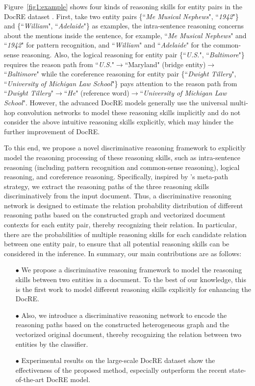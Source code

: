 \documentclass[11pt,a4paper]{article}
\begin{document}
Figure~\ref{fig1:example} shows four kinds of reasoning skills for entity pairs in the DocRE dataset \cite{yao-etal-2019-docred}.
First, take two entity pairs \{``\textit{Me Musical Nephews}", ``\textit{1942}"\} and \{``\textit{William}", ``\textit{Adelaide}"\} as examples, the intra-sentence reasoning concerns about the mentions inside the sentence, for example, ``\textit{Me Musical Nephews}" and ``\textit{1942}" for pattern recognition, and ``\textit{William}" and ``\textit{Adelaide}" for the common-sense reasoning.
Also, the logical reasoning for entity pair \{``\textit{U.S.}", ``\textit{Baltimore}"\} requires the reason path from ``\textit{U.S.}"$\to$``Maryland" (bridge entity)$\to$``\textit{Baltimore}" while the coreference reasoning for entity pair \{``\textit{Dwight Tillery}", ``\textit{University of Michigan Law School}"\} pays attention to the reason path from ``\textit{Dwight Tillery}"$\to$``\textit{He}" (reference word)$\to$``\textit{University of Michigan Law School}".
However, the advanced DocRE models generally use the universal multi-hop convolution networks to model these reasoning skills implicitly and do not consider the above intuitive reasoning skills explicitly, which may hinder the further improvement of DocRE.

To this end, we propose a novel discriminative reasoning framework to explicitly model the reasoning processing of these reasoning skills, such as intra-sentence reasoning (including pattern recognition and common-sense reasoning), logical reasoning, and coreference reasoning.
Specifically, inspired by \citeauthor{docred-rec}'s meta-path strategy, we extract the reasoning paths of the three reasoning skills discriminatively from the input document.
Thus, a discriminative reasoning network is designed to estimate the relation probability distribution of different reasoning paths based on the constructed graph and vectorized document contexts for each entity pair, thereby recognizing their relation.
In particular, there are the probabilities of multiple reasoning skills for each candidate relation between one entity pair, to ensure that all potential reasoning skills can be considered in the inference.
In summary, our main contributions are as follows:
\begin{enumerate}
\item[$\bullet$] 
We propose a discriminative reasoning framework to model the reasoning skills between two entities in a document. 
To the best of our knowledge, this is the first work to model different reasoning skills explicitly for enhancing the DocRE.
\item[$\bullet$]
Also, we introduce a discriminative reasoning network to encode the reasoning paths based on the constructed heterogeneous graph and the vectorized original document, thereby recognizing the relation between two entities by the classifier.
\item[$\bullet$]
Experimental results on the large-scale DocRE dataset show the effectiveness of the proposed method, especially outperform the recent state-of-the-art DocRE model.
\end{enumerate}
\end{document}
